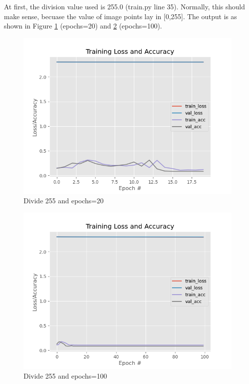 At first, the division value used is 255.0 (train.py line 35).
Normally, this should make sense, becuase the value of image points lay in [0,255].
The output is as shown in Figure \ref{fig:div255-epochs20} (epochs=20) and \ref{fig:div255-epochs100} (epochs=100).
\begin{figure}[!ht]
  \centering
  \includegraphics[width=\textwidth]{pics/epochs20_div255}
  \caption{Divide 255 and epochs=20}
  \label{fig:div255-epochs20}
\end{figure}


\begin{figure}[!ht]
  \centering
  \includegraphics[width=\textwidth]{pics/epochs100_div255}
  \caption{Divide 255 and epochs=100}
  \label{fig:div255-epochs100}
\end{figure}


